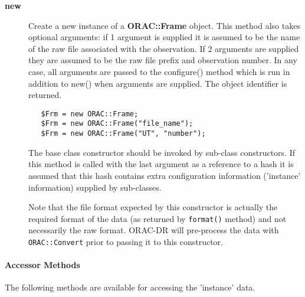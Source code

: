 \begin{description}

\item[\textbf{new}] \mbox{}

Create a new instance of a \textbf{ORAC::Frame} object.  This method also
takes optional arguments: if 1 argument is supplied it is assumed to
be the name of the raw file associated with the observation.  If 2
arguments are supplied they are assumed to be the raw file prefix and
observation number.  In any case, all arguments are passed to the
configure() method which is run in addition to new() when arguments
are supplied.  The object identifier is returned.

\begin{verbatim}
   $Frm = new ORAC::Frame;
   $Frm = new ORAC::Frame("file_name");
   $Frm = new ORAC::Frame("UT", "number");
\end{verbatim}


The base class constructor should be invoked by sub-class constructors.
If this method is called with the last argument as a reference to
a hash it is assumed that this hash contains extra configuration
information ('instance' information) supplied by sub-classes.



Note that the file format expected by this constructor is actually the
required format of the data (as returned by \texttt{format()} method) and not
necessarily the raw format.  ORAC-DR will pre-process the data with
\texttt{ORAC::Convert} prior to passing it to this constructor.

\end{description}
\paragraph*{Accessor Methods\label{ORAC::Frame_Accessor_Methods}}


The following methods are available for accessing the 
'instance' data.

